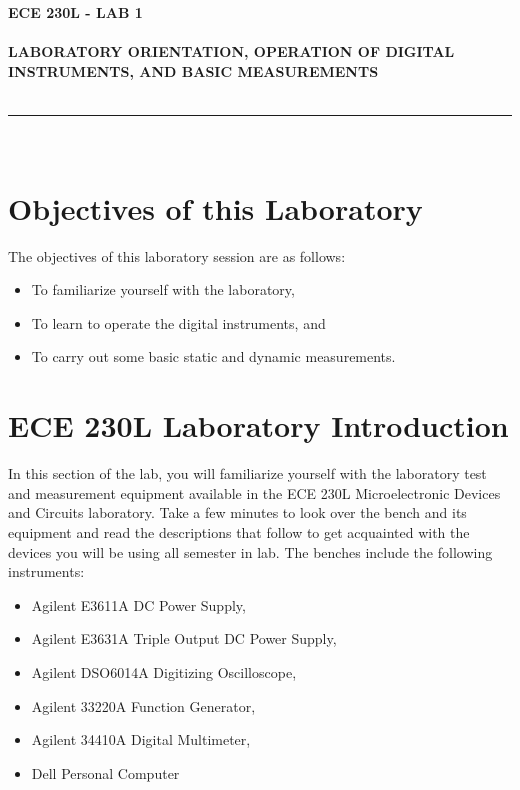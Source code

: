\documentclass[12pt]{../manual}
\begin{document}
\begin{center}
\textbf{\huge ECE 230L - LAB 1}\\~\\
\textbf{\large LABORATORY ORIENTATION, OPERATION OF DIGITAL INSTRUMENTS, AND BASIC MEASUREMENTS }\\~\\
\rule{6.5in}{0.5mm}\\
\end{center}

\tableofcontents

\listoffigures

\newpage
%
\section{Objectives of this Laboratory}
The objectives of this laboratory session are as follows:
\begin{itemize}
\item To familiarize yourself with the laboratory, 
\item To learn to operate the digital instruments, and 
\item To carry out some basic static and dynamic measurements. 
\end{itemize}

\section{ECE 230L Laboratory Introduction}
In this section of the lab, you will familiarize yourself with the laboratory test and measurement equipment available in the ECE 230L Microelectronic Devices and Circuits laboratory.  Take a few minutes to look over the bench and its equipment and read the descriptions that follow to get acquainted with the devices you will be using all semester in lab. The benches include the following instruments:
\begin{itemize}
\item Agilent E3611A DC Power Supply, 
\item Agilent E3631A Triple Output DC Power Supply, 
\item Agilent DSO6014A Digitizing Oscilloscope, 
\item Agilent 33220A Function Generator, 
\item Agilent 34410A Digital Multimeter, 
\item Dell Personal Computer
\end{itemize}
\end{document}
